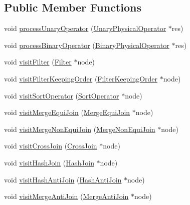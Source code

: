 \subsection*{Public Member Functions}
\begin{DoxyCompactItemize}
\item 
void \hyperlink{class_cloning_physical_operator_visitor_ac57b783d90f26dd8c1a9418aab5ab2a6}{process\+Unary\+Operator} (\hyperlink{class_unary_physical_operator}{Unary\+Physical\+Operator} $\ast$res)
\item 
void \hyperlink{class_cloning_physical_operator_visitor_a47cf1dcc2e5dedb2328f66676de4102b}{process\+Binary\+Operator} (\hyperlink{class_binary_physical_operator}{Binary\+Physical\+Operator} $\ast$res)
\item 
void \hyperlink{class_cloning_physical_operator_visitor_ac1b811ff2fd316b05d64f85c2e87fd9c}{visit\+Filter} (\hyperlink{class_filter}{Filter} $\ast$node)
\item 
void \hyperlink{class_cloning_physical_operator_visitor_a41aff61c8da3a7b88beddb6aaffb211e}{visit\+Filter\+Keeping\+Order} (\hyperlink{class_filter_keeping_order}{Filter\+Keeping\+Order} $\ast$node)
\item 
void \hyperlink{class_cloning_physical_operator_visitor_a5bb911312d752fcc31b48bb21f658bdf}{visit\+Sort\+Operator} (\hyperlink{class_sort_operator}{Sort\+Operator} $\ast$node)
\item 
void \hyperlink{class_cloning_physical_operator_visitor_ae1eb095ee91c30030c7830a9b999a6ec}{visit\+Merge\+Equi\+Join} (\hyperlink{class_merge_equi_join}{Merge\+Equi\+Join} $\ast$node)
\item 
void \hyperlink{class_cloning_physical_operator_visitor_a6b17fd37e070917db7152f869517eb4a}{visit\+Merge\+Non\+Equi\+Join} (\hyperlink{class_merge_non_equi_join}{Merge\+Non\+Equi\+Join} $\ast$node)
\item 
void \hyperlink{class_cloning_physical_operator_visitor_aa48e6141645ce53d8cae2b1678fdc2d4}{visit\+Cross\+Join} (\hyperlink{class_cross_join}{Cross\+Join} $\ast$node)
\item 
void \hyperlink{class_cloning_physical_operator_visitor_abb1f8426172480eb5968abd7f9deb541}{visit\+Hash\+Join} (\hyperlink{class_hash_join}{Hash\+Join} $\ast$node)
\item 
void \hyperlink{class_cloning_physical_operator_visitor_a661c04bfbdf0d36e745fc82bf8f8a193}{visit\+Hash\+Anti\+Join} (\hyperlink{class_hash_anti_join}{Hash\+Anti\+Join} $\ast$node)
\item 
void \hyperlink{class_cloning_physical_operator_visitor_af32410ddcbf200eb102bbe8ad5ad1859}{visit\+Merge\+Anti\+Join} (\hyperlink{class_merge_anti_join}{Merge\+Anti\+Join} $\ast$node)

\end{DoxyCompactItemize}
